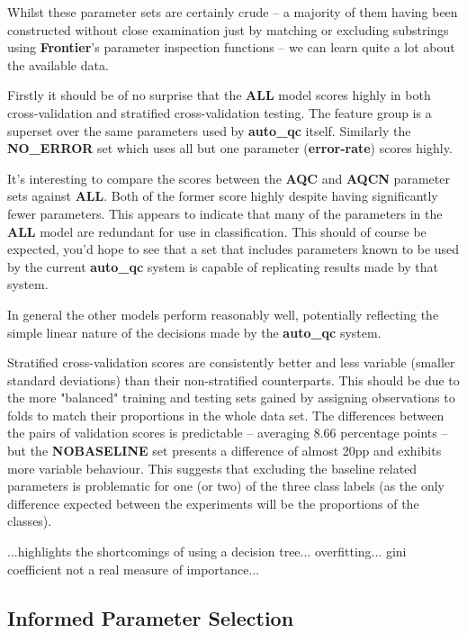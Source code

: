 Whilst these parameter sets are certainly crude -- a majority of them having
been constructed without close examination just by matching or excluding
substrings using \textbf{Frontier}'s parameter inspection functions -- we can
learn quite a lot about the available data.

Firstly it should be of no surprise that the \textbf{ALL} model scores highly in
both cross-validation and stratified cross-validation testing. The feature group
is a superset over the same parameters used by \textbf{auto\_qc} itself.
Similarly the \textbf{NO\_ERROR} set which uses all but one parameter
(\textbf{error-rate}) scores highly.

It's interesting to compare the scores between the \textbf{AQC} and
\textbf{AQCN} parameter sets against \textbf{ALL}. Both of the former score
highly despite having significantly fewer parameters. This appears to indicate
that many of the parameters in the \textbf{ALL} model are redundant for use in
classification. This should of course be expected, you'd hope to see that a set
that includes parameters known to be used by the current \textbf{auto\_qc} system
is capable of replicating results made by that system.

In general the other models perform reasonably well, potentially reflecting the
simple linear nature of the decisions made by the \textbf{auto\_qc} system.

Stratified cross-validation scores are consistently better and less variable
(smaller standard deviations) than their non-stratified counterparts. This
should be due to the more "balanced" training and testing sets
gained by assigning observations to folds to match their proportions in the
whole data set. The differences between the pairs of validation scores is
predictable -- averaging 8.66 percentage points -- but the \textbf{NOBASELINE}
set presents a difference of almost 20pp and exhibits more variable behaviour.
This suggests that excluding the baseline related parameters is problematic for
one (or two) of the three class labels (as the only difference expected between the
experiments will be the proportions of the classes).


...highlights the shortcomings of using a decision tree...
overfitting... gini coefficient not a real measure of importance...

\subsection{Informed Parameter Selection}

